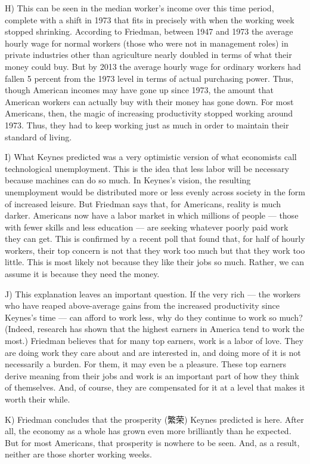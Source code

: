 \documentclass[UTF8,11pt]{ctexart}
\begin{document}
H) This can be seen in the median worker’s income over this time period, complete with a shift in 1973 that fits in precisely with when the working week stopped shrinking. According to Friedman, between 1947 and 1973 the average hourly wage for normal workers (those who were not in management roles) in private industries other than agriculture nearly doubled in terms of what their money could buy. But by 2013 the average hourly wage for ordinary workers had fallen 5 percent from the 1973 level in terms of actual purchasing power. Thus, though American incomes may have gone up since 1973, the amount that American workers can actually buy with their money has gone down. For most Americans, then, the magic of increasing productivity stopped working around 1973. Thus, they had to keep working just as much in order to maintain their standard of living.


I) What Keynes predicted was a very optimistic version of what economists call technological unemployment. This is the idea that less labor will be necessary because machines can do so much. In Keynes’s vision, the resulting unemployment would be distributed more or less evenly across society in the form of increased leisure. But Friedman says that, for Americans, reality is much darker. Americans now have a labor market in which millions of people — those with fewer skills and less education — are seeking whatever poorly paid work they can get. This is confirmed by a recent poll that found that, for half of hourly workers, their top concern is not that they work too much but that they work too little. This is most likely not because they like their jobs so much. Rather, we can assume it is because they need the money.


J) This explanation leaves an important question. If the very rich — the workers who have reaped above-average gains from the increased productivity since Keynes’s time — can afford to work less, why do they continue to work so much? (Indeed, research has shown that the highest earners in America tend to work the most.) Friedman believes that for many top earners, work is a labor of love. They are doing work they care about and are interested in, and doing more of it is not necessarily a burden. For them, it may even be a pleasure. These top earners derive meaning from their jobs and work is an important part of how they think of themselves. And, of course, they are compensated for it at a level that makes it worth their while.


K) Friedman concludes that the prosperity (繁荣) Keynes predicted is here. After all, the economy as a whole has grown even more brilliantly than he expected. But for most Americans, that prosperity is nowhere to be seen. And, as a result, neither are those shorter working weeks.
\end{document}
